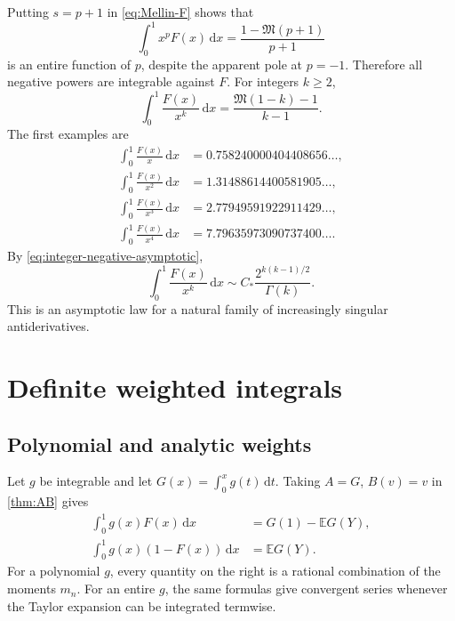 \documentclass[11pt,oneside]{article}
\theoremstyle{definition}
\newcommand{\F}{F}
\newcommand{\M}{\mathfrak M}
\newcommand{\E}{\mathbb E}
\newcommand{\dd}{\,\mathrm d}
\begin{document}
Putting \(s=p+1\) in \cref{eq:Mellin-F} shows that
\begin{equation}\label{eq:weighted-F-complete}
 \int_0^1x^p\F(x)\dd x
 =\frac{1-\M(p+1)}{p+1}
\end{equation}
is an entire function of \(p\), despite the apparent pole at \(p=-1\).  Therefore
all negative powers are integrable against \(\F\).  For integers \(k\ge2\),
\begin{equation}\label{eq:singular-F-integers}
 \int_0^1\frac{\F(x)}{x^k}\dd x
 =\frac{\M(1-k)-1}{k-1}.
\end{equation}
The first examples are
\begin{align}
 \int_0^1\frac{\F(x)}{x}\dd x
 &=0.758240000404408656\ldots,\nonumber\\
 \int_0^1\frac{\F(x)}{x^2}\dd x
 &=1.31488614400581905\ldots,\nonumber\\
 \int_0^1\frac{\F(x)}{x^3}\dd x
 &=2.77949591922911429\ldots,\nonumber\\
 \int_0^1\frac{\F(x)}{x^4}\dd x
 &=7.79635973090737400\ldots.\label{eq:singular-F-values}
\end{align}
By \cref{eq:integer-negative-asymptotic},
\begin{equation}\label{eq:singular-F-asymptotic}
 \int_0^1\frac{\F(x)}{x^k}\dd x
 \sim C_*\frac{2^{k(k-1)/2}}{\Gamma(k)}.
\end{equation}
This is an asymptotic law for a natural family of increasingly singular antiderivatives.

\section{Definite weighted integrals}

\subsection{Polynomial and analytic weights}

Let \(g\) be integrable and let \(G(x)=\int_0^xg(t)\dd t\).  Taking \(A=G\),
\(B(v)=v\) in \cref{thm:AB} gives
\begin{align}
 \int_0^1g(x)\F(x)\dd x&=G(1)-\E G(Y),
 \label{eq:analytic-kernel-F}\\
 \int_0^1g(x)(1-\F(x))\dd x&=\E G(Y).
 \label{eq:analytic-kernel-up}
\end{align}
For a polynomial \(g\), every quantity on the right is a rational combination of the
moments \(m_n\).  For an entire \(g\), the same formulas give convergent series whenever
the Taylor expansion can be integrated termwise.
\end{document}
